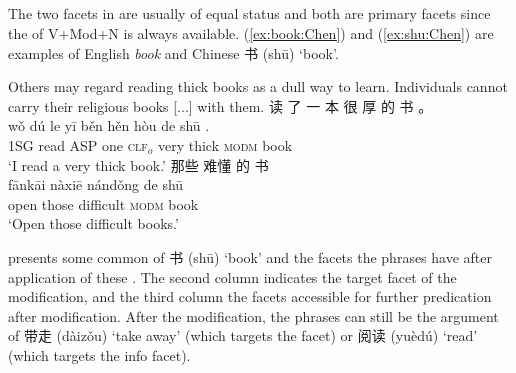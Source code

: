 \documentclass[output=paper,colorlinks,citecolor=brown,chinesefont]{langscibook}
\begin{document}

\subsection{\dott{}}
The two facets in \dott{} are usually of equal status and both are primary facets since the  of V+Mod+N is always available. (\ref{ex:book:Chen}) and (\ref{ex:shu:Chen}) are  examples of English \emph{book} and Chinese {\cn 书} (sh\={u}) `book'.

\ea \label{ex:book:Chen}
\ea \label{ex:readheavybook:Chen} Others may regard reading thick books as a dull way to learn.
\ex \label{ex:carryinfobook:Chen} Individuals cannot carry their religious books [...] %
 with them.
\z
\ex \label{ex:shu:Chen}
\ea
{} {\cn 读} {\cn 了} {\cn 一} {\cn 本} {\cn 很} {\cn 厚} {\cn 的} {\cn 书} {\cn 。}\\
w\v{o} d\'{u} le y\={i} b\v{e}n h\v{e}n h\`{o}u de sh\={u} . \\
1SG read ASP one \textsc{clf}$_o$ very thick \textsc{modm} book\\
\glt `I read a very thick book.'
\ex
{} {\cn 那些} {\cn 难懂} {\cn 的} {\cn 书}\\
f\={a}nk\={a}i n\`{a}xi\={e} n\'{a}nd\v{o}ng de sh\={u}\\
open those difficult \textsc{modm} book\\
\glt `Open those difficult books.'
\z\z

 presents some common  of {\cn 书} (sh\={u}) `book' and the facets the phrases have after application of %
 these . The second column indicates the target facet of the modification, %
  and the third column %
   the facets accessible for further predication after modification. %
 After the modification, %
  the phrases can still be the argument of {\cn 带走} (d\`{a}iz\v{o}u) `take away' (which targets the  facet) or {\cn 阅读} (yu\`{e}d\'{u}) `read' (which targets the info facet). %
\end{document}
